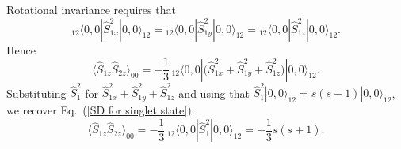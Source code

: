 Rotational invariance requires that 
\begin{equation}
{_{12\!}}\langle 0,0| \hat{S}_{1x}^2|0,0\rangle_{12} = {_{12\!}}\langle 0,0| \hat{S}_{1y}^2|0,0\rangle_{12} = {_{12\!}}\langle 0,0| \hat{S}_{1z}^2|0,0\rangle_{12}.
\label{aa product prob 3}  
\end{equation}
Hence
\begin{equation}
\langle \hat{S}_{1z} \hat{S}_{2z} \rangle_{00} = - \frac13 \, {_{12\!}}\langle 0,0| \big( \hat{S}_{1x}^2+\hat{S}_{1y}^2+\hat{S}_{1z}^2 \big) |0,0\rangle_{\!12}.
\label{aa product prob 4}  
\end{equation}
Substituting $\hat{S}_{1}^2$ for $\hat{S}_{1x}^2+\hat{S}_{1y}^2+\hat{S}_{1z}^2$ and using that $\hat{S}_{1}^2 |0,0\rangle_{\!12} = s(s+1) |0,0\rangle_{12}$, we recover Eq.\ (\ref{SD for singlet state}): 
\begin{equation}
\langle \hat{S}_{1z} \hat{S}_{2z} \rangle_{00} = -\frac13 \, {_{12\!}}\langle 0,0| \hat{S}_{1}^2|0,0\rangle_{\!12}  = -\frac13 s(s+1).
\label{aa product prob 5} 
\end{equation}
 
